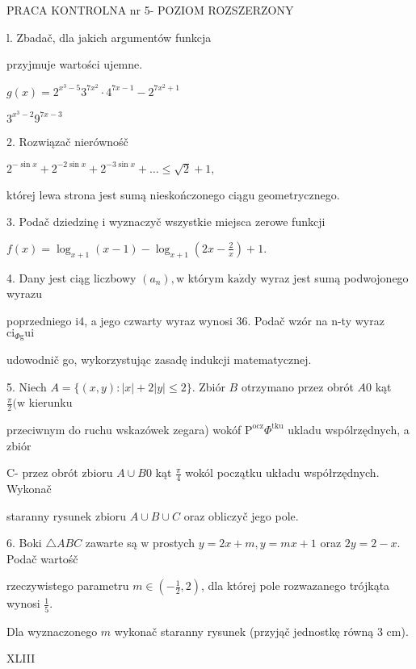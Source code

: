 \documentclass[a4paper,12pt]{article}
\begin{document}
PRACA KONTROLNA nr 5- POZIOM ROZSZERZONY

l. Zbadač, dla jakich argumentów funkcja

przyjmuje wartości ujemne.

$g(x)=2^{x^{3}-5} 3^{7x^{2}}\cdot 4^{7x-1}-2^{7x^{2}+1}$

$3^{x^{3}-2} 9^{7x-3}$

2. Rozwiązač nierównośč

$2^{-\sin x}+2^{-2\sin x}+2^{-3\sin x}+\ldots\leq\sqrt{2}+1,$

której lewa strona jest sumą nieskończonego ciągu geometrycznego.

3. Podač dziedzinę i wyznaczyč wszystkie miejsca zerowe funkcji

$f(x)=\displaystyle \log_{x+1}(x-1)-\log_{x+1}(2x-\frac{2}{x})+1.$

4. Dany jest ciąg liczbowy $(a_{n}), \mathrm{w}$ którym $\mathrm{k}\mathrm{a}\dot{\mathrm{z}}\mathrm{d}\mathrm{y}$ wyraz jest sumą podwojonego wyrazu

poprzedniego $\mathrm{i}4$, a jego czwarty wyraz wynosi 36. Podač wzór na n-ty wyraz $\mathrm{c}\mathrm{i}_{\Phi \mathrm{g}}\mathrm{u}\mathrm{i}$

udowodnič go, wykorzystując zasadę indukcji matematycznej.

5. Niech $A=\{(x,y):|x|+2|y|\leq 2\}$. Zbiór $B$ otrzymano przez obrót $A0$ kąt $\displaystyle \frac{\pi}{2}(\mathrm{w}$ kierunku

przeciwnym do ruchu wskazówek zegara) wokóf $\mathrm{P}^{\mathrm{o}\mathrm{c}\mathrm{z}}\Phi^{\mathrm{t}\mathrm{k}\mathrm{u}}$ ukladu wspólrzędnych, a zbiór

C- przez obrót zbioru $A\cup B0$ kąt $\displaystyle \frac{\pi}{4}$ wokól początku układu współrzędnych. Wykonač

staranny rysunek zbioru $A\cup B\cup C$ oraz obliczyč jego pole.

6. Boki $\triangle ABC$ zawarte są $\mathrm{w}$ prostych $y=2x+m, y=mx+1$ oraz $2y=2-x$. Podač wartośč

rzeczywistego parametru $m\displaystyle \in(-\frac{1}{2},2)$, dla której pole rozwazanego trójkąta wynosi $\displaystyle \frac{1}{5}.$

Dla wyznaczonego $m$ wykonač staranny rysunek (przyjąč jednostkę równą 3 cm).







XLIII
\end{document}
